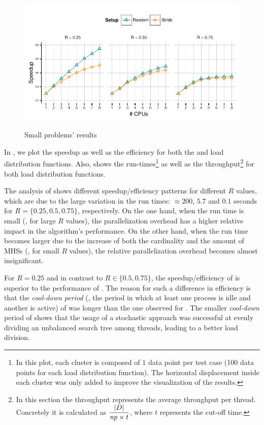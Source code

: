 \begin{figure}[!ht]
  \\[0.5em]
  \includegraphics[trim=0.5em 0em 0em 5.5em, clip, page=3]{figures/mhs2/figures/parallel_small.pdf}
  \caption{Small problems' results\label{fig:mhs2p:results:small}}

\end{figure}

In , we plot the speedup as well as the
efficiency for both the \strideFn{} and \randomFn{} load distribution
functions.
%
Also,  shows the run-times\footnote{In
  this plot, each cluster is composed of $1$ data point per test case
  (100 data points for each load distribution function). The
  horizontal displacement inside each cluster was only added to
  improve the visualization of the results.} as well as the
throughput\footnote{In this section the throughput represents the
  average throughput per thread.
  Concretely it is calculated as $\displaystyle\frac{|D|}{\mathit{np}
    \times t}$, where $t$ represents the cut-off time.} for both load
distribution functions.

The analysis of  shows different
speedup/efficiency patterns for different $R$ values, which are due to
the large variation in the run times: $\approx 200$, $5.7$ and $0.1$
seconds for $R=\{0.25,0.5,0.75\}$, respectively.
%
On the one hand, when the run time is small (\ie, for large $R$
values), the parallelization overhead has a higher relative impact in
the algorithm's performance.
%
On the other hand, when the run time becomes larger due to the
increase of both the cardinality and the amount of \acp{MHS} (\ie, for
small $R$ values), the relative parallelization overhead becomes
almost insignificant.


For $R = 0.25$ and in contrast to $R \in \{0.5,0.75\}$, the
speedup/efficiency of \randomFn{} is superior to the performance
of \strideFn{}.
%
The reason for such a difference in efficiency is that the
\emph{cool-down period} (\ie, the period in which at least one process
is idle and another is active) of \strideFn{} was longer than the one
observed for \randomFn{}.
%
The smaller \emph{cool-down} period of \randomFn{} shows that the
usage of a stochastic approach was successful at evenly dividing an
unbalanced search tree among threads, leading to a better load
division.

